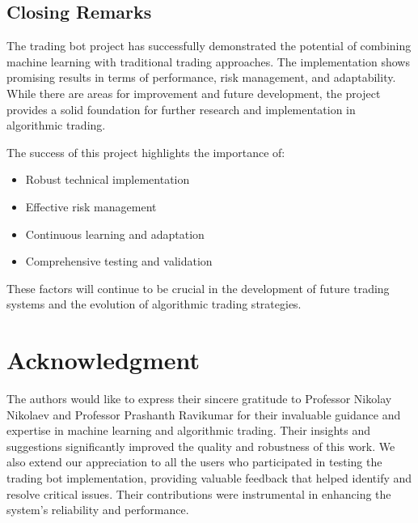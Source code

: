\documentclass[conference]{IEEEtran}
\begin{document}
\subsection{Closing Remarks}
The trading bot project has successfully demonstrated the potential of combining machine learning with traditional trading approaches. The implementation shows promising results in terms of performance, risk management, and adaptability. While there are areas for improvement and future development, the project provides a solid foundation for further research and implementation in algorithmic trading.

The success of this project highlights the importance of:
\begin{itemize}
    \item Robust technical implementation
    \item Effective risk management
    \item Continuous learning and adaptation
    \item Comprehensive testing and validation
\end{itemize}

These factors will continue to be crucial in the development of future trading systems and the evolution of algorithmic trading strategies.

\section*{Acknowledgment}
The authors would like to express their sincere gratitude to Professor Nikolay Nikolaev and Professor Prashanth Ravikumar for their invaluable guidance and expertise in machine learning and algorithmic trading. Their insights and suggestions significantly improved the quality and robustness of this work. We also extend our appreciation to all the users who participated in testing the trading bot implementation, providing valuable feedback that helped identify and resolve critical issues. Their contributions were instrumental in enhancing the system's reliability and performance.
\end{document}
